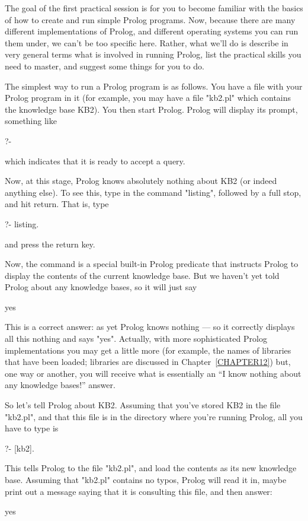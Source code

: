 The goal of the first practical session is for you to become familiar
with the basics of how to create and run simple Prolog programs.  Now,
because there are many different implementations of Prolog, and
different operating systems you can run them under, we can't be too
specific here. Rather, what we'll do is describe in very general terms
what is involved in running Prolog, list the practical skills you
need to master, and suggest some things for you to do.

The simplest way to run a Prolog program is as follows. You have a
file with your Prolog program in it (for example, you may have a file
"kb2.pl" which contains the knowledge base KB2). You then start Prolog.
Prolog will display its prompt, something like
%
\begin{LPNcodedisplay}
?-
\end{LPNcodedisplay}
%
which indicates that it is ready to accept a query.

Now, at this stage, Prolog knows absolutely nothing about KB2 (or
indeed anything else). To see this, type in the command "listing",
 followed by a full stop,
and hit return. That is, type
%
\begin{LPNcodedisplay}
?- listing.
\end{LPNcodedisplay}
%
and press the return key.


Now, the  command is a special built-in Prolog
predicate that instructs Prolog to display the contents of the current
knowledge base.  But we haven't yet told Prolog about any knowledge
bases, so it will just say
%
\begin{LPNcodedisplay}
yes
\end{LPNcodedisplay}
%
This is a correct answer: as yet Prolog knows nothing --- so it
correctly displays all this nothing and says "yes". Actually, with
more sophisticated Prolog implementations you may get a little more
(for example, the names of libraries that have been loaded; libraries
are discussed in Chapter~\ref{CHAPTER12})  but, one way or another,
you will receive what is essentially an ``I know nothing about any
knowledge bases!'' answer.

So let's tell Prolog about KB2. Assuming that you've stored KB2 in the
file "kb2.pl", and that this file is in the  directory where
you're running Prolog, all you have to type is
%
\begin{LPNcodedisplay}
?- [kb2].
\end{LPNcodedisplay}
This tells Prolog to  the file "kb2.pl", and load the
contents as its new knowledge base. Assuming that  "kb2.pl"
contains no typos, Prolog will read it in, maybe print out a message
saying that it is consulting this file, and then answer:
%
\begin{LPNcodedisplay}
yes
\end{LPNcodedisplay}


